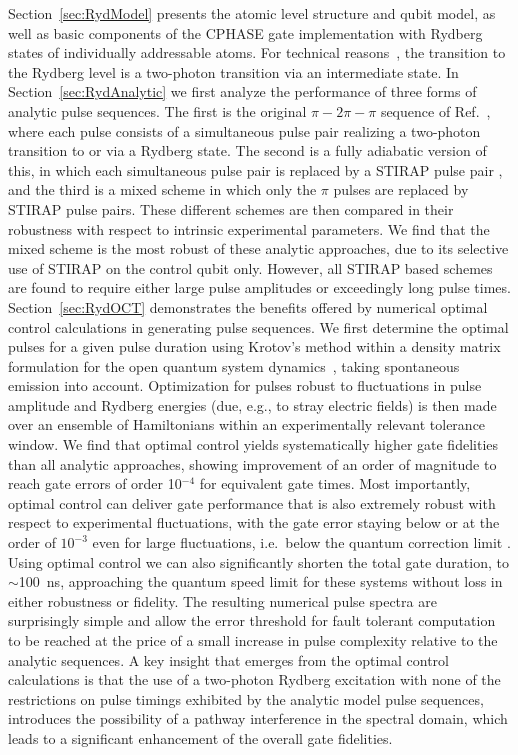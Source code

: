 Section~\ref{sec:RydModel}
presents the atomic level structure and qubit model, as well as basic
components of the CPHASE gate implementation with
Rydberg states of individually addressable atoms.
For technical reasons~\cite{GaetanNatPhys2009,WilkPRL10}, the
transition to the Rydberg level is 
a two-photon transition via an intermediate state.
In Section~\ref{sec:RydAnalytic} we first analyze the performance of three forms of
analytic pulse sequences.
The first is the original $\pi - 2\pi-\pi$ sequence
of Ref.~\cite{JakschPRL00}, where each pulse consists of a simultaneous pulse pair
realizing a two-photon transition to or via a Rydberg state.
The second is a fully adiabatic version of this, in which each simultaneous pulse pair is
replaced by a STIRAP pulse pair \cite{rao2014stirap},
and the third is a mixed scheme in which only the $\pi$
pulses are replaced by STIRAP pulse pairs.  These different schemes are then
compared in their robustness with respect to intrinsic experimental parameters.
We find that the mixed scheme is the most robust of these analytic approaches,
due to its selective use of STIRAP on the control qubit only.  However, all
STIRAP based schemes are found to require either large pulse
amplitudes or exceedingly long 
pulse times.  Section~\ref{sec:RydOCT} demonstrates the benefits offered by
numerical optimal control calculations in generating pulse sequences.
We first determine the optimal pulses  for a given pulse duration using 
Krotov's method \cite{Konnov99,PalaoPRA03,ReichKochJCP12}
within a density matrix formulation for the open quantum system
dynamics~\cite{Goerz3States}, taking 
spontaneous emission into account.  Optimization for pulses robust to
fluctuations in pulse amplitude and Rydberg energies (due, e.g., to
stray electric fields) is then made over an ensemble of Hamiltonians within an
experimentally relevant tolerance window.  We find that optimal control yields
systematically higher gate fidelities than all analytic approaches, showing
improvement of an order of magnitude to reach gate errors of order 10$^{-4}$
for equivalent gate times.  Most importantly, optimal control can deliver gate
performance that is also extremely robust with respect to experimental
fluctuations, with the gate error staying below or at the order of $10^{-3}$
even for large fluctuations, i.e.\ below the quantum correction limit
\cite{aliferis2008err}.
Using optimal control we can also significantly shorten the total gate duration,
to $\sim$100~ns, approaching the quantum speed limit for these systems without
loss in either robustness or fidelity.  The resulting numerical
pulse spectra are surprisingly simple and allow the
error threshold for fault tolerant computation to be reached at the price of a small
increase in pulse complexity relative to the analytic sequences.
A key insight that emerges from the optimal control calculations is that the use of a two-photon Rydberg excitation with none of the restrictions on pulse timings exhibited by the analytic model pulse sequences, introduces the possibility
of a pathway interference in the spectral domain, which leads to a significant enhancement of the overall gate fidelities. 

